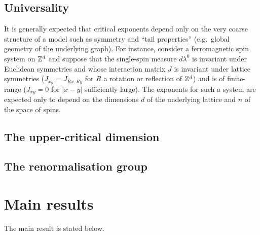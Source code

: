 
\subsection{Universality}

It is generally expected that critical exponents depend only on the very coarse structure of a model such as symmetry and ``tail properties'' (e.g.\ global geometry of the underlying graph). For instance, consider a ferromagnetic spin system on ${ {{\mathbb Z}}^d }$ and suppose that the single-spin measure
$d\lambda^0$ is invariant under Euclidean symmetries and whose interaction matrix $J$ is invariant under lattice symmetries ($J_{xy} = J_{Rx,Ry}$ for $R$ a rotation or reflection of ${ {{\mathbb Z}}^d }$) and is of finite-range ($J_{xy} = 0$ for $|x - y|$ sufficiently large). The exponents for such a system are expected only to depend on the dimensions $d$ of the underlying lattice and $n$ of the space of spins.



\subsection{The upper-critical dimension}


\subsection{The renormalisation group}


\section{Main results}

The main result is stated below.

